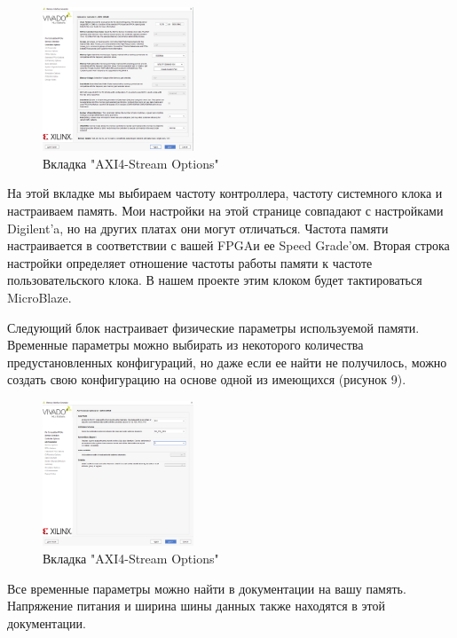 \documentclass[a4paper,oneside ,10pt]{extreport}
\begin{document}
\begin{figure}[h]
	\centering
	\includegraphics[width=0.4\textwidth]{image/mig_4.png}
	\caption{Вкладка "AXI4-Stream Options"}
	\label{cordic_axi4_stream_options}
\end{figure}

На этой вкладке мы выбираем частоту контроллера, частоту системного клока и настраиваем память. Мои настройки на этой странице совпадают с настройками Digilent’a, но на других платах они могут отличаться. Частота памяти настраивается в соответствии с вашей FPGAи ее Speed Grade’ом. Вторая строка настройки определяет отношение частоты работы памяти к частоте пользовательского клока. В нашем проекте этим клоком будет тактироваться MicroBlaze.

Следующий блок настраивает физические параметры используемой памяти. Временные параметры можно выбирать из некоторого количества предустановленных конфигураций, но даже если ее найти не получилось, можно создать свою конфигурацию на основе одной из имеющихся (рисунок 9).

\begin{figure}[h]
	\centering
	\includegraphics[width=0.4\textwidth]{image/mig_5.png}
	\caption{Вкладка "AXI4-Stream Options"}
	\label{cordic_axi4_stream_options}
\end{figure}

Все временные параметры можно найти в документации на вашу память. Напряжение питания и ширина шины данных также находятся в этой документации.
\end{document}
